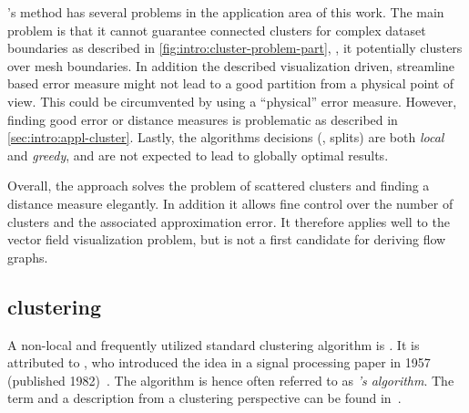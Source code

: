 's method has several problems in the application area of this work.
The main problem is that it cannot guarantee connected clusters for complex dataset boundaries as described in \autoref{fig:intro:cluster-problem-part}, \ie, it potentially clusters over mesh boundaries.
In addition the described visualization driven, streamline based error measure might not lead to a good partition from a physical point of view. This could be circumvented by using a ``physical'' error measure. However, finding good error or distance measures is problematic as described in \autoref{sec:intro:appl-cluster}.
Lastly, the algorithms decisions (\ie, splits) are both \emph{local} and \emph{greedy}, and are not expected to lead to globally optimal results.

Overall, the approach solves the problem of scattered clusters and finding a distance measure elegantly. In addition it allows fine control over the number of clusters and the associated approximation error. It therefore applies well to the vector field visualization problem, but is not a first candidate for deriving flow graphs.



\subsection{\texorpdfstring{\kMeans clustering}{k-means clustering}}
\label{sec:related:kMeans}

A non-local and frequently utilized standard clustering algorithm is \emph{\kMeans.} It is attributed to , who introduced the idea in a signal processing paper in 1957 (published 1982)~\cite{Lloyd}. The algorithm is hence often referred to as \emph{'s algorithm}.
The term \emph{\kMeans} and a description from a clustering perspective can be found in~\cite{MacQueen}.

